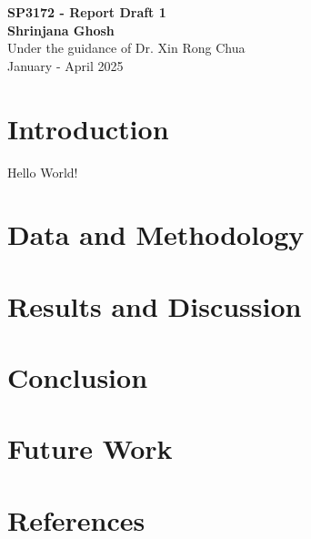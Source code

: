 \documentclass{article}
\begin{document}
\begin{titlepage}
    \centering
    {\Huge \textbf{SP3172 - Report Draft 1}}\\[1.5cm]
    {\Large \textbf{Shrinjana Ghosh}}\\[0.5cm]
    {\large Under the guidance of Dr. Xin Rong Chua}\\[0.5cm]
    {\large January - April 2025}\\[3cm]
    \vfill
\end{titlepage}

\tableofcontents
\newpage

\section*{Introduction}
Hello World!

\section*{Data and Methodology}

\section*{Results and Discussion}

\section*{Conclusion}

\section*{Future Work}

\section*{References}
\end{document}
